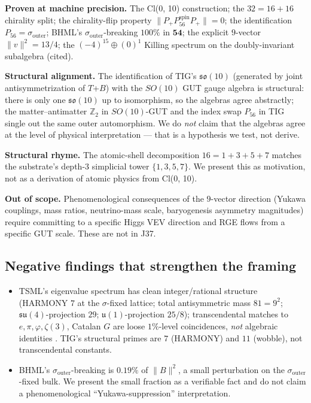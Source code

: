 \documentclass[11pt,reqno]{amsart}
\theoremstyle{definition}
\newcommand{\Z}{\mathbb{Z}}
\newcommand{\so}{\mathfrak{so}}
\newcommand{\su}{\mathfrak{su}}
\newcommand{\uone}{\mathfrak{u}}
\newcommand{\TSML}{T}
\newcommand{\BHML}{B}
\newcommand{\Psix}{P_{56}}
\newcommand{\Psixspin}{P_{56}^{\mathrm{spin}}}
\newcommand{\sout}{\sigma_{\mathrm{outer}}}
\begin{document}
\textbf{Proven at machine precision.} The Cl(0, 10) construction;
the $32 = 16 + 16$ chirality split; the chirality-flip property
$\|P_+ \Psixspin P_+\| = 0$; the identification $\Psix = \sout$;
BHML's $\sout$-breaking $100\%$ in $\mathbf{54}$; the explicit
$9$-vector $\|v\|^2 = 13/4$; the $(-4)^{15} \oplus (0)^1$ Killing
spectrum on the doubly-invariant subalgebra (cited).

\textbf{Structural alignment.} The identification of TIG's $\so(10)$
(generated by joint antisymmetrization of $\TSML$+$\BHML$) with the
$SO(10)$ GUT gauge algebra is structural: there is only one
$\so(10)$ up to isomorphism, so the algebras agree abstractly; the
matter--antimatter $\Z_2$ in $SO(10)$-GUT and the index swap
$\Psix$ in TIG single out the same outer automorphism. We do
\emph{not} claim that the algebras agree at the level of physical
interpretation — that is a hypothesis we test, not derive.

\textbf{Structural rhyme.} The atomic-shell decomposition $16 =
1+3+5+7$ matches the substrate's depth-$3$ simplicial tower
$\{1, 3, 5, 7\}$. We present this as motivation, not as a
derivation of atomic physics from Cl(0, 10).

\textbf{Out of scope.} Phenomenological consequences of the
$9$-vector direction (Yukawa couplings, mass ratios,
neutrino-mass scale, baryogenesis asymmetry magnitudes) require
committing to a specific Higgs VEV direction and RGE flows from a
specific GUT scale. These are not in J37.

\subsection{Negative findings that strengthen the framing}

\begin{itemize}[leftmargin=*]
\item TSML's eigenvalue spectrum has clean integer/rational
structure (HARMONY $7$ at the $\sigma$-fixed lattice; total
antisymmetric mass $81 = 9^2$; $\su(4)$-projection $29$;
$\uone(1)$-projection $25/8$); transcendental matches to
$e, \pi, \varphi, \zeta(3)$, Catalan $G$ are loose $1\%$-level
coincidences, \emph{not} algebraic identities
\cite{Sanders2026CLEigenvaluesAudit}. TIG's structural primes are
$7$ (HARMONY) and $11$ (wobble), not transcendental constants.
\item BHML's $\sout$-breaking is $0.19\%$ of $\|B\|^2$, a small
perturbation on the $\sout$-fixed bulk. We present the small
fraction as a verifiable fact and do not claim a phenomenological
``Yukawa-suppression'' interpretation.
\end{itemize}
\end{document}

